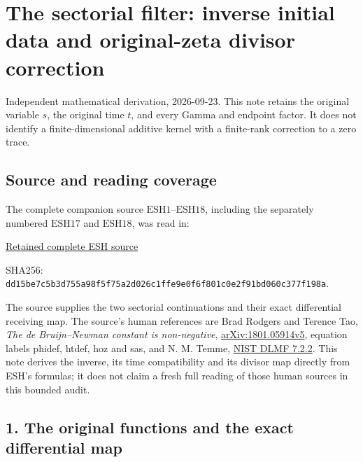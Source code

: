\documentclass[
  10pt,
  a4paper,
]{article}
\author{}
\date{}
\begin{document}
{
\setcounter{tocdepth}{3}
\tableofcontents
}
\section{The sectorial filter: inverse initial data and original-zeta
divisor
correction}\label{the-sectorial-filter-inverse-initial-data-and-original-zeta-divisor-correction}

Independent mathematical derivation, 2026-09-23. This note retains the
original variable \(s\), the original time \(t\), and every Gamma and
endpoint factor. It does not identify a finite-dimensional additive
kernel with a finite-rank correction to a zero trace.

\subsection{Source and reading
coverage}\label{source-and-reading-coverage}

The complete companion source \(\mathrm{ESH1}\)--\(\mathrm{ESH18}\),
including the separately numbered \(\mathrm{ESH17}\) and
\(\mathrm{ESH18}\), was read in:

\href{supporting_proofs/ENDPOINT_SECTORIAL_HEAT_EXTENSION.tex}{Retained
complete ESH source}

SHA256:
\texttt{dd15be7c\allowbreak{}5b3d755a\allowbreak{}98f5f75a\allowbreak{}2d026c1f\allowbreak{}fe9e0f6f\allowbreak{}801c0e2f\allowbreak{}91bd060c\allowbreak{}377f198a}.

The source supplies the two sectorial continuations and their exact
differential receiving map. The source's human references are Brad
Rodgers and Terence Tao, \emph{The de Bruijn--Newman constant is
non-negative},
\href{https://arxiv.org/abs/1801.05914v5}{arXiv:1801.05914v5}, equation
labels phidef, htdef, hoz and sas, and N. M. Temme,
\href{https://dlmf.nist.gov/7.2.E2}{NIST DLMF 7.2.2}. This note derives
the inverse, its time compatibility and its divisor map directly from
ESH's formulas; it does not claim a fresh full reading of those human
sources in this bounded audit.

\subsection{1. The original functions and the exact differential
map}\label{the-original-functions-and-the-exact-differential-map}
\end{document}

